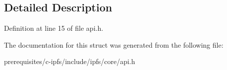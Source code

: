 \subsection{Detailed Description}


Definition at line 15 of file api.\+h.



The documentation for this struct was generated from the following file\+:\begin{DoxyCompactItemize}
\item 
prerequisites/c-\/ipfs/include/ipfs/core/api.\+h\end{DoxyCompactItemize}
